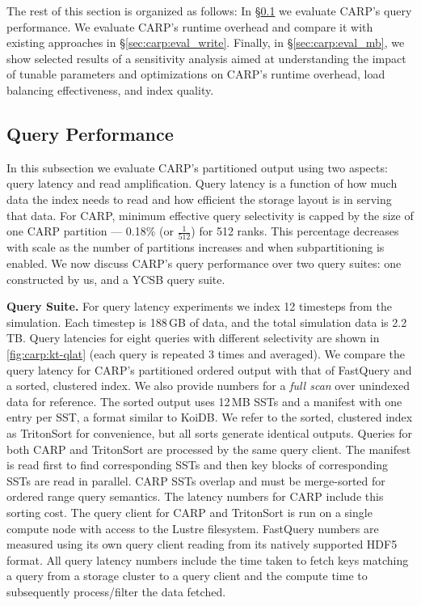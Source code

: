 The rest of this section is organized as follows: In \S\ref{sec:carp:eval_read} we evaluate CARP's
query performance.
We evaluate CARP's runtime overhead and compare it with existing approaches in
\S\ref{sec:carp:eval_write}.
Finally, in \S\ref{sec:carp:eval_mb}, we show selected results of a sensitivity analysis aimed at
understanding the impact of tunable parameters and optimizations on CARP's runtime overhead, load
balancing effectiveness, and index quality.

\subsection{Query Performance}
\label{sec:carp:eval_read}

In this subsection we evaluate CARP's partitioned output using two aspects: query latency and read
amplification.
Query latency is a function of how much data the index needs to read and how efficient the storage
layout is in serving that data.
For CARP, minimum effective query selectivity is capped by the size of one CARP partition ---
0.18\% (or $\frac{1}{512}$) for 512 ranks.
This percentage decreases with scale as the number of partitions increases and when subpartitioning
is enabled.
We now discuss CARP's query performance over two query suites: one constructed by us, and a YCSB
query suite.

\vspace{5pt}
\vspace{5pt}

\figCarpKtQlat

\textbf{Query Suite.
}
For query latency experiments we index 12 timesteps from the simulation.
Each timestep is 188\,GB of data, and the total simulation data is 2.2\,TB.
Query latencies for eight queries with different selectivity are shown in \cref{fig:carp:kt-qlat}
(each query is repeated 3 times and averaged).
We compare the query latency for CARP's partitioned ordered output with that of FastQuery and a
sorted, clustered index.
We also provide numbers for a \emph{full scan} over unindexed data for reference.
The sorted output uses 12\,MB SSTs and a manifest with one entry per SST, a format similar to KoiDB.
We refer to the sorted, clustered index as TritonSort for convenience, but all sorts generate
identical outputs.
Queries for both CARP and TritonSort are processed by the same query client.
The manifest is read first to find corresponding SSTs and then key blocks of corresponding SSTs are
read in parallel.
CARP SSTs overlap and must be merge-sorted for ordered range query semantics.
The latency numbers for CARP include this sorting cost.
The query client for CARP and TritonSort is run on a single compute node with access to the Lustre
filesystem.
FastQuery numbers are measured using its own query client reading from its natively supported HDF5
format.
All query latency numbers include the time taken to fetch keys matching a query from a storage
cluster to a query client and the compute time to subsequently process/filter the data fetched.

